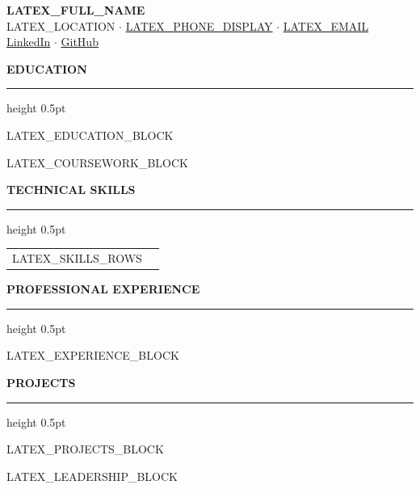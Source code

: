 \documentclass[10pt,letterpaper]{article}
\newcommand{\resumesection}[1]{
    \par\noindent
    \vspace{6pt}
    {\color{sectioncolor}\large\textbf{\uppercase{#1}}}
    \vspace{3pt}
    \hrule height 0.5pt
    \vspace{3pt}
}
\begin{document}
\begin{center}
    {\Huge\color{namecolor}\textbf{LATEX_FULL_NAME}}\\
    \vspace{1pt}
    LATEX_LOCATION $\cdot$
    \href{tel:LATEX_PHONE_RAW}{LATEX_PHONE_DISPLAY} $\cdot$
    \href{mailto:LATEX_EMAIL}{LATEX_EMAIL}\\
    \vspace{0pt}
    \href{LATEX_LINKEDIN_URL}{LinkedIn} $\cdot$
    \href{LATEX_GITHUB_URL}{GitHub}
\end{center}

\resumesection{Education}
LATEX_EDUCATION_BLOCK

LATEX_COURSEWORK_BLOCK

\resumesection{Technical Skills}
\begin{tabular}{@{}p{1.7in}p{5.0in}@{}}
LATEX_SKILLS_ROWS
\end{tabular}

\resumesection{Professional Experience}
LATEX_EXPERIENCE_BLOCK

\resumesection{Projects}
LATEX_PROJECTS_BLOCK

LATEX_LEADERSHIP_BLOCK
\end{document}
